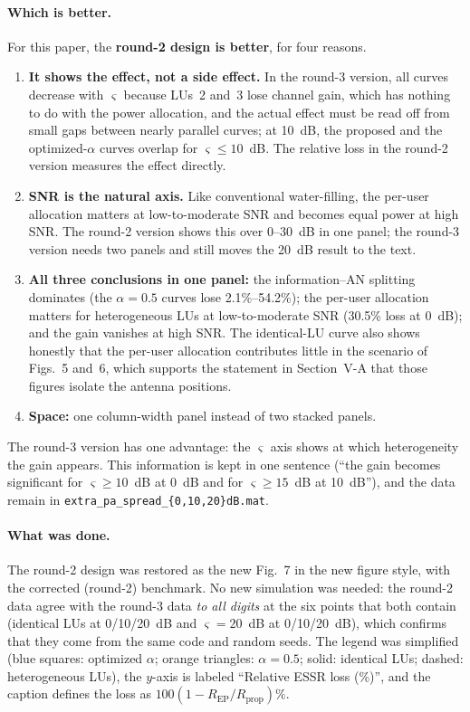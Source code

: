 \documentclass[10pt,a4paper]{article}
\newcommand{\code}[1]{\texttt{#1}}
\begin{document}
\paragraph{Which is better.} For this paper, the \textbf{round-2 design is better}, for four reasons.
\begin{enumerate}
\item \textbf{It shows the effect, not a side effect.} In the round-3 version, all curves decrease with $\varsigma$ because LUs~2 and~3 lose channel gain, which has nothing to do with the power allocation, and the actual effect must be read off from small gaps between nearly parallel curves; at 10~dB, the proposed and the optimized-$\alpha$ curves overlap for $\varsigma\le10$~dB. The relative loss in the round-2 version measures the effect directly.
\item \textbf{SNR is the natural axis.} Like conventional water-filling, the per-user allocation matters at low-to-moderate SNR and becomes equal power at high SNR. The round-2 version shows this over 0--30~dB in one panel; the round-3 version needs two panels and still moves the 20~dB result to the text.
\item \textbf{All three conclusions in one panel:} the information--AN splitting dominates (the $\alpha=0.5$ curves lose 2.1\%--54.2\%); the per-user allocation matters for heterogeneous LUs at low-to-moderate SNR (30.5\% loss at 0~dB); and the gain vanishes at high SNR. The identical-LU curve also shows honestly that the per-user allocation contributes little in the scenario of Figs.~5 and~6, which supports the statement in Section~V-A that those figures isolate the antenna positions.
\item \textbf{Space:} one column-width panel instead of two stacked panels.
\end{enumerate}
The round-3 version has one advantage: the $\varsigma$ axis shows at which heterogeneity the gain appears. This information is kept in one sentence (``the gain becomes significant for $\varsigma\ge10$~dB at 0~dB and for $\varsigma\ge15$~dB at 10~dB''), and the data remain in \code{extra\_pa\_spread\_\{0,10,20\}dB.mat}.

\paragraph{What was done.} The round-2 design was restored as the new Fig.~7 in the new figure style, with the corrected (round-2) benchmark. No new simulation was needed: the round-2 data agree with the round-3 data \emph{to all digits} at the six points that both contain (identical LUs at 0/10/20~dB and $\varsigma=20$~dB at 0/10/20~dB), which confirms that they come from the same code and random seeds. The legend was simplified (blue squares: optimized $\alpha$; orange triangles: $\alpha=0.5$; solid: identical LUs; dashed: heterogeneous LUs), the $y$-axis is labeled ``Relative ESSR loss (\%)'', and the caption defines the loss as $100(1-R_{\mathrm{EP}}/R_{\mathrm{prop}})\%$.
\end{document}
